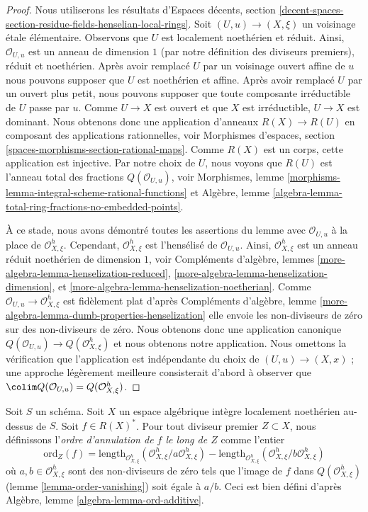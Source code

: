 \begin{proof}
Nous utiliserons les résultats d'Espaces décents, section
\ref{decent-spaces-section-residue-fields-henselian-local-rings}.
Soit $(U, u) \to (X, \xi)$ un voisinage \'etale élémentaire.
Observons que $U$ est localement noethérien et réduit.
Ainsi, $\mathcal{O}_{U, u}$ est un anneau de dimension $1$
(par notre définition des diviseurs premiers),
réduit et noethérien.
Après avoir remplacé $U$ par un voisinage ouvert affine de $u$
nous pouvons supposer que $U$ est noethérien et affine.
Après avoir remplacé $U$ par un ouvert plus petit, nous pouvons supposer que toute
composante irréductible de $U$ passe par $u$.
Comme $U \to X$ est ouvert et que $X$ est irréductible, $U \to X$ est dominant.
Nous obtenons donc une application d'anneaux $R(X) \to R(U)$ en composant des applications rationnelles, voir
Morphismes d'espaces, section \ref{spaces-morphisms-section-rational-maps}.
Comme $R(X)$ est un corps, cette application est injective.
Par notre choix de $U$, nous voyons que $R(U)$ est l'anneau total des fractions
$Q(\mathcal{O}_{U, u})$, voir
Morphismes, lemme \ref{morphisms-lemma-integral-scheme-rational-functions}
et
Algèbre, lemme \ref{algebra-lemma-total-ring-fractions-no-embedded-points}.

\medskip\noindent
À ce stade, nous avons démontré toutes les assertions du lemme avec
$\mathcal{O}_{U, u}$ à la place de $\mathcal{O}_{X, \xi}^h$.
Cependant, $\mathcal{O}_{X, \xi}^h$ est l'hensélisé de
$\mathcal{O}_{U, u}$. Ainsi, $\mathcal{O}_{X, \xi}^h$ est un anneau
réduit noethérien de dimension $1$, voir
Compléments d'algèbre, lemmes
\ref{more-algebra-lemma-henselization-reduced},
\ref{more-algebra-lemma-henselization-dimension}, et
\ref{more-algebra-lemma-henselization-noetherian}.
Comme $\mathcal{O}_{U, u} \to \mathcal{O}_{X, \xi}^h$ est
fidèlement plat d'après Compléments d'algèbre, lemme
\ref{more-algebra-lemma-dumb-properties-henselization}
elle envoie les non-diviseurs de zéro sur des non-diviseurs de zéro.
Nous obtenons donc une application canonique
$Q(\mathcal{O}_{U, u}) \to Q(\mathcal{O}_{X, \xi}^h)$
et nous obtenons notre application.
Nous omettons la vérification que l'application est indépendante du
choix de $(U, u) \to (X, x)$ ; une approche légèrement meilleure
consisterait d'abord à observer que
$\colim Q(\mathcal{O}_{U, u}) = Q(\mathcal{O}_{X, \xi}^h)$.
\end{proof}

\begin{definition}
\label{definition-order-vanishing}
Soit $S$ un schéma. Soit $X$ un espace algébrique intègre localement noethérien
au-dessus de $S$. Soit $f \in R(X)^*$. Pour tout diviseur premier
$Z \subset X$, nous définissons l'{\it ordre d'annulation de $f$ le long de $Z$}
comme l'entier
$$
\text{ord}_Z(f) =
\text{length}_{\mathcal{O}_{X, \xi}^h}
(\mathcal{O}_{X, \xi}^h/a \mathcal{O}_{X, \xi}^h) -
\text{length}_{\mathcal{O}_{X, \xi}^h}
(\mathcal{O}_{X, \xi}^h/b \mathcal{O}_{X, \xi}^h)
$$
où $a, b \in \mathcal{O}_{X, \xi}^h$ sont des non-diviseurs de zéro
tels que l'image de $f$ dans $Q(\mathcal{O}_{X, \xi}^h)$
(lemme \ref{lemma-order-vanishing}) soit égale à $a/b$.
Ceci est bien défini d'après
Algèbre, lemme \ref{algebra-lemma-ord-additive}.
\end{definition}

